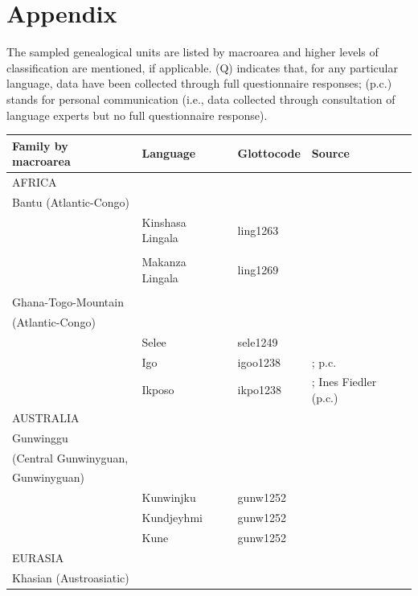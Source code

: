\documentclass[output=collectionpaper]{langsci/langscibook}
\begin{document}
\printbibliography[heading=subbibliography,notkeyword=this]

\newpage

\section*{Appendix}
\label{appendix}
\scriptsize{The sampled genealogical units are listed by macroarea and higher levels of classification are mentioned, if applicable. (Q) indicates that, for any particular language, data have been collected through full questionnaire responses; (p.c.\@) stands for personal communication (i.e., data collected through consultation of language experts but no full questionnaire response).}
\begin{table}[htp!]
\scriptsize
 \begin{tabular}{llll} %
  \lsptoprule
Family by macroarea & Language &Glottocode & Source\\
\midrule
AFRICA &&&\\
\midrule
Bantu (Atlantic-Congo) & &&\\
&Kinshasa Lingala& ling1263 & \citet{Bokamba1977}\\
&&& \citet{Meeuwis2013}\\
& Makanza Lingala&ling1269 & \citet{Boeck1904,Bokamba1977}\\
&&& \citet{Meeuwis2013}\\
\midrule
Ghana-Togo-Mountain && & \\
(Atlantic-Congo)  && & \\
& Selee& sele1249 &  \citet{Agbetsoamedo2014}\\
&Igo&igoo1238 &  \citet{Gblem-Poidi2007}; p.c.\\
& Ikposo&ikpo1238 &\citet{Soubrier2013}; Ines Fiedler (p.c.)\\
\midrule
AUSTRALIA &&&\\
\midrule
 Gunwinggu && &\\
(Central Gunwinyguan, & &&\\
Gunwinyguan) & &&\\
& Kunwinjku&gunw1252 & \citet{Evans2003}\\
& Kundjeyhmi&gunw1252 & \citet{Evans2003} \\
& Kune&gunw1252 & \citet{Evans2003}\\
\midrule
EURASIA &&&\\
\midrule
Khasian (Austroasiatic)&  &&\\

\end{tabular}
\end{table}
\end{document}
